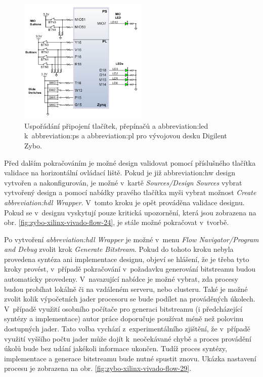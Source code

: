 \documentclass[a4paper, twoside, 11pt]{article}
\begin{document}
\begin{appendices}
		\begin{figure}[htbp!]
			\centering
			\includegraphics[width=0.55\textwidth]{src/png/digilent-zybo-ps-pl-gpio.png}
			\caption{Uspořádání připojení tlačítek, přepínačů a \gls{abbreviation:led} k~\gls{abbreviation:ps} a \gls{abbreviation:pl} pro vývojovou desku Digilent Zybo. \cite{digilent-zybo-reference-manual}}
			\label{fig:digilent-zybo-ps-pl-gpio}
		\end{figure}


		Před dalším pokračováním je možné design validovat pomocí příslušného tlačítka validace na horizontální ovládací liště. Pokud je již \gls{abbreviation:hw} design vytvořen a nakonfigurován, je možné v~kartě \textit{Sources/Design Sources} vybrat vytvořený design a pomocí nabídky pravého tlačítka myši vybrat možnost \textit{Create \gls{abbreviation:hdl} Wrapper}. V~tomto kroku je opět prováděna validace designu. Pokud se v~designu vyskytují pouze kritická upozornění, která jsou zobrazena na obr. \ref{fig:zybo-xilinx-vivado-flow-24}, je stále možné pokračovat v~tvorbě.\par
		Po vytvoření \textit{\gls{abbreviation:hdl} Wrapper} je možné v~menu \textit{Flow Navigator/Program and Debug} zvolit krok \textit{Generate Bitstream}. Pokud do tohoto kroku nebyla provedena syntéza ani implementace designu, objeví se hlášení, že je třeba tyto kroky provést, v~případě pokračování v~požadavku generování bitstreamu budou automaticky provedeny. V~navazující nabídce je možné vybrat, zda procesy budou probíhat lokálně či na vzdáleném serveru, nebo clusteru. Také je možné zvolit kolik výpočetních jader procesoru se bude podílet na prováděných úkolech. V~případě využití osobního počítače pro generaci bitstreamu (i předcházející syntézy a implementace) autor práce doporučuje používat méně než polovinu dostupných jader. Tato volba vychází z~experimentálního zjištění, že v~případě využití vyššího počtu jader může dojít k~neočekávané chybě a proces provádění úkolů bude bez udání jakékoli informace ukončen. Tudíž proces syntézy, implementace a generace bitstreamu bude nutné spustit znovu. Ukázka nastavení procesu je zobrazena na obr. \ref{fig:zybo-xilinx-vivado-flow-29}.\par



\end{appendices}
\end{document}
